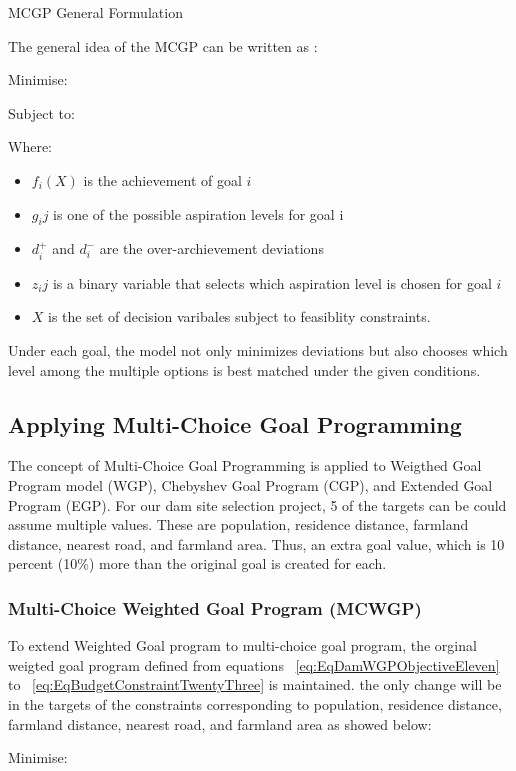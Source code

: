 MCGP General Formulation

The general idea of the MCGP can be written as \cite{CHANG2007}:

Minimise:
       \EqMCGPObjectiveFourty

Subject to:
       \EqMCGPConstraintFourtyOne

Where:
\begin{itemize}
  \item $f_i(X)$ is the achievement of goal $i$
  \item $g_ij$ is one of the possible aspiration levels for goal i
  \item $d_i^+$ and $d_i^-$ are the over-archievement deviations
  \item $z_ij$ is a binary variable that selects which aspiration level is chosen for goal $i$
  \item $X$ is the set of decision varibales subject to feasiblity constraints.
\end{itemize}
Under each goal, the model not only minimizes deviations but also chooses which level among the multiple options is best matched under the given conditions.

\subsection{Applying Multi-Choice Goal Programming}

The concept of Multi-Choice Goal Programming is applied to Weigthed Goal Program model (WGP), Chebyshev Goal Program (CGP), and Extended Goal Program (EGP).
For our dam site selection project, 5 of the targets can be could assume multiple values. These are population, residence distance, farmland distance, nearest road, and farmland area. Thus, an extra goal value, which is 10 percent (10\%) more than the original goal is created for each.

\subsubsection{Multi-Choice Weighted Goal Program (MCWGP)}
To extend Weighted Goal program to multi-choice goal program, the orginal weigted goal program defined from equations ~\eqref{eq:EqDamWGPObjectiveEleven} to ~\eqref{eq:EqBudgetConstraintTwentyThree} is maintained. the only change will be in the targets of the constraints corresponding to population, residence distance, farmland distance, nearest road, and farmland area as showed below:

Minimise:
\EqDamWGPObjectiveEleven

